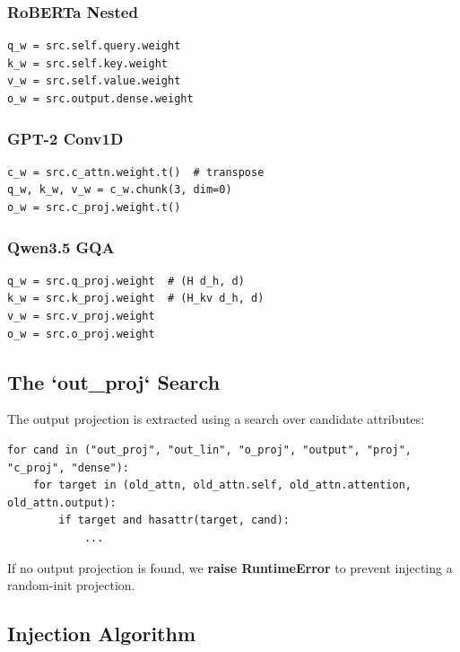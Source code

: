 \subsubsection{RoBERTa Nested}

\begin{lstlisting}
q_w = src.self.query.weight
k_w = src.self.key.weight
v_w = src.self.value.weight
o_w = src.output.dense.weight
\end{lstlisting}

\subsubsection{GPT-2 Conv1D}

\begin{lstlisting}
c_w = src.c_attn.weight.t()  # transpose
q_w, k_w, v_w = c_w.chunk(3, dim=0)
o_w = src.c_proj.weight.t()
\end{lstlisting}

\subsubsection{Qwen3.5 GQA}

\begin{lstlisting}
q_w = src.q_proj.weight  # (H d_h, d)
k_w = src.k_proj.weight  # (H_kv d_h, d)
v_w = src.v_proj.weight
o_w = src.o_proj.weight
\end{lstlisting}

\subsection{The `out\_proj` Search}

The output projection is extracted using a search over candidate attributes:

\begin{lstlisting}
for cand in ("out_proj", "out_lin", "o_proj", "output", "proj", "c_proj", "dense"):
    for target in (old_attn, old_attn.self, old_attn.attention, old_attn.output):
        if target and hasattr(target, cand):
            ...
\end{lstlisting}

If no output projection is found, we \textbf{raise RuntimeError} to prevent 
injecting a random-init projection.

\subsection{Injection Algorithm}

